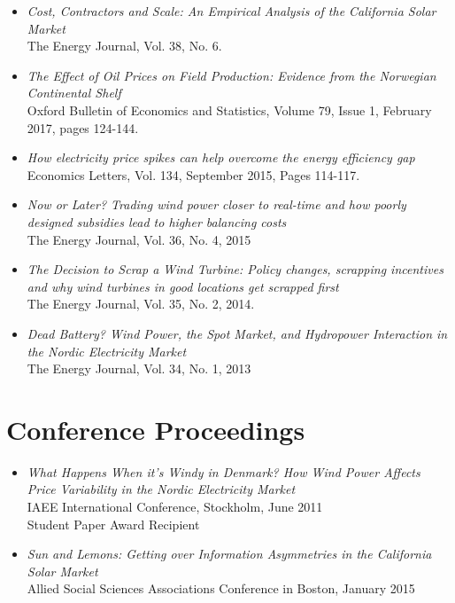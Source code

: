 \documentclass[margin]{res}
\begin{document}
\begin{resume}
\begin{itemize}
\item[] \emph{Cost, Contractors and Scale: An Empirical Analysis of the California Solar Market}  \\
The Energy Journal, Vol. 38, No. 6. 

\item[] \emph{The Effect of Oil Prices on Field Production: Evidence from the Norwegian Continental Shelf}\\
Oxford Bulletin of Economics and Statistics, Volume 79, Issue 1, February 2017, pages 124-144. 

\item[] \emph{How electricity price spikes can help overcome the energy efficiency gap}\\
Economics Letters, Vol. 134, September 2015, Pages 114-117.

\item[] \emph{Now or Later? Trading wind power closer to real-time and how poorly designed subsidies lead to higher balancing costs}\\
The Energy Journal, Vol. 36, No. 4, 2015 

\item[] \emph{The Decision to Scrap a Wind Turbine: Policy changes, scrapping incentives and why wind turbines in good locations get scrapped first}\\
The Energy Journal, Vol. 35, No. 2, 2014.

\item[] \emph{Dead Battery? Wind Power, the Spot Market, and Hydropower Interaction in the Nordic Electricity Market}\\
The Energy Journal, Vol. 34, No. 1, 2013
\end{itemize}

\normalsize{\section{Conference Proceedings}}
\begin{itemize}  
\setlength{\itemsep}{10pt}
\item[] \emph{What Happens When it's Windy in Denmark? How Wind Power Affects Price Variability in the Nordic Electricity Market}\\ 
IAEE International Conference, Stockholm, June 2011  \\
Student Paper Award Recipient 

\item[] \emph {Sun and Lemons: Getting over Information Asymmetries in the California Solar Market} \\
Allied Social Sciences Associations Conference in Boston, January 2015


\end{itemize}
\end{resume}
\end{document}
